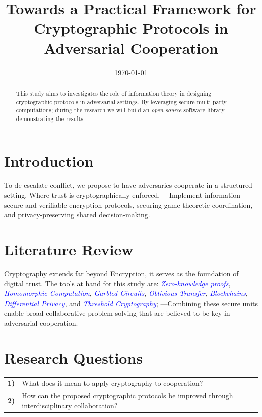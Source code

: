 \documentclass[conference]{IEEEtran}
\date{\today}
\begin{document}
\title{Towards a Practical Framework for Cryptographic Protocols in Adversarial Cooperation}
\author{
}

\maketitle

\begin{abstract}
This study aims to investigates the role of information theory in designing cryptographic protocols in adversarial settings. 
By leveraging secure multi-party computations; during the research we will build 
an \textit{open-source} software library demonstrating the results.
\end{abstract}

\section{Introduction}
To de-escalate conflict, we propose to have adversaries cooperate in a structured setting. Where trust is cryptographically enforced. 
---Implement information-secure and verifiable encryption protocols, securing game-theoretic coordination, and privacy-preserving shared decision-making. 

\section{Literature Review}
Cryptography extends far beyond Encryption, it serves as the foundation of digital trust. The tools at hand for this study are: 
\textcolor{blue}{\textit{Zero-knowledge proofs}}, 
\textcolor{blue}{\textit{Homomorphic Computation}}, 
\textcolor{blue}{\textit{Garbled Circuits}}, 
\textcolor{blue}{\textit{Oblivious Transfer}}, 
\textcolor{blue}{\textit{Blockchains}}, 
\textcolor{blue}{\textit{Differential Privacy}}, and 
\textcolor{blue}{\textit{Threshold Cryptography}}; 
---Combining these secure units enable broad collaborative problem-solving that are believed to be key in adversarial cooperation.

\vspace{5pt}
\section{Research Questions}

\begin{tabular}{lp{210pt}}
    {\small \textbf{1)}} & {\small What does it mean to apply cryptography to cooperation?} \\
    {\small \textbf{2)}} & {\small How can the proposed cryptographic protocols be improved through interdisciplinary collaboration?}
\end{tabular}
    
\end{document}
